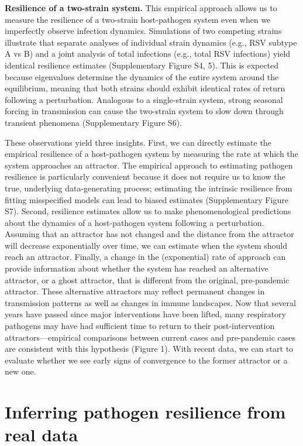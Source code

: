 \documentclass[12pt]{article}
\begin{document}
\textbf{Resilience of a two-strain system.} 
This empirical approach allows us to measure the resilience of a two-strain host-pathogen system even when we imperfectly observe infection dynamics.
Simulations of two competing strains illustrate that separate analyses of individual strain dynamics (e.g., RSV subtype A vs B) and a joint analysis of total infections (e.g., total RSV infections) yield identical resilience estimates (Supplementary Figure S4, 5).
This is expected because eigenvalues determine the dynamics of the entire system around the equilibrium, meaning that both strains should exhibit identical rates of return following a perturbation.
Analogous to a single-strain system, strong seasonal forcing in transmission can cause the two-strain system to slow down through transient phenomena (Supplementary Figure S6).

These observations yield three insights.
First, we can directly estimate the empirical resilience of a host-pathogen system by measuring the rate at which the system approaches an attractor.
The empirical approach to estimating pathogen resilience is particularly convenient because it does not require us to know the true, underlying data-generating process;
estimating the intrinsic resilience from fitting misspecified models can lead to biased estimates (Supplementary Figure S7).
Second, resilience estimates allow us to make phenomenological predictions about the dynamics of a host-pathogen system following a perturbation.
Assuming that an attractor has not changed and the distance from the attractor will decrease exponentially over time, we can estimate when the system should reach an attractor.
Finally, a change in the (exponential) rate of approach can provide information about whether the system has reached an alternative attractor, or a ghost attractor, that is different from the original, pre-pandemic attractor.
These alternative attractors may reflect permanent changes in transmission patterns as well as changes in immune landscapes.
Now that several years have passed since major interventions have been lifted, many respiratory pathogens may have had sufficient time to return to their post-intervention attractors---empirical comparisons between current cases and pre-pandemic cases are consistent with this hypothesis (Figure 1).
With recent data, we can start to evaluate whether we see early signs of convergence to the former attractor or a new one.

\section*{Inferring pathogen resilience from real data}
\end{document}
